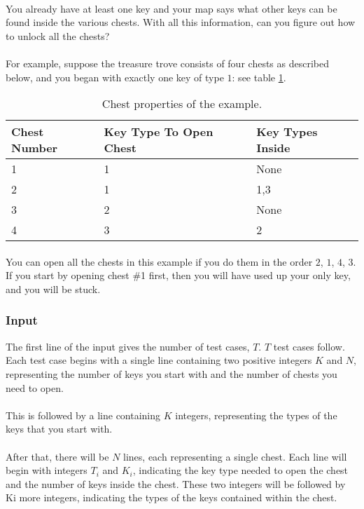 \documentclass[titlepage]{article}
\begin{document}
\paragraph{}
You already have at least one key and your map says what other keys can be found inside the various chests. With all this information, can you figure out how to unlock all the chests?
\paragraph{}
For example, suppose the treasure trove consists of four chests as described below, and you began with exactly one key of type $1$: see table \ref{tbl:treasure}.
\begin{table}[hbt]
\centering
\begin{tabular}{l|l|l}
Chest Number&Key Type To Open Chest&Key Types Inside\\\hline
1&1&None\\
2&1&1,3\\
3&2&None\\
4&3&2
\end{tabular}
\caption{Chest properties of the example.}
\label{tbl:treasure}
\end{table}
\paragraph{}
You can open all the chests in this example if you do them in the order $2$, $1$, $4$, $3$. If you start by opening chest \#1 first, then you will have used up your only key, and you will be stuck.

\subsubsection{Input}
The first line of the input gives the number of test cases, $T$. $T$ test cases follow. Each test case begins with a single line containing two positive integers $K$ and $N$, representing the number of keys you start with and the number of chests you need to open.
\paragraph{}
This is followed by a line containing $K$ integers, representing the types of the keys that you start with.
\paragraph{}
After that, there will be $N$ lines, each representing a single chest. Each line will begin with integers $T_i$ and $K_i$, indicating the key type needed to open the chest and the number of keys inside the chest. These two integers will be followed by Ki more integers, indicating the types of the keys contained within the chest.
\end{document}
